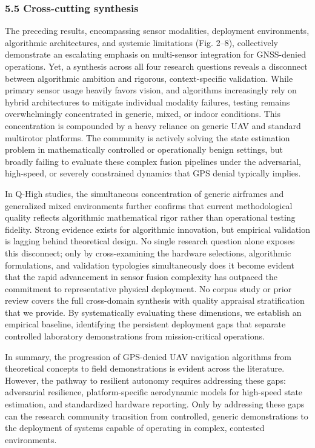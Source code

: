 \documentclass[conference]{IEEEtran}
\begin{document}
\subsubsection{5.5 Cross-cutting synthesis}


The preceding results, encompassing sensor modalities, deployment environments, algorithmic architectures, and systemic limitations (Fig. 2–8), collectively demonstrate an escalating emphasis on multi-sensor integration for GNSS-denied operations. Yet, a synthesis across all four research questions reveals a disconnect between algorithmic ambition and rigorous, context-specific validation. While primary sensor usage heavily favors vision, and algorithms increasingly rely on hybrid architectures to mitigate individual modality failures, testing remains overwhelmingly concentrated in generic, mixed, or indoor conditions. This concentration is compounded by a heavy reliance on generic UAV and standard multirotor platforms. The community is actively solving the state estimation problem in mathematically controlled or operationally benign settings, but broadly failing to evaluate these complex fusion pipelines under the adversarial, high-speed, or severely constrained dynamics that GPS denial typically implies.


In Q-High studies, the simultaneous concentration of generic airframes and generalized mixed environments further confirms that current methodological quality reflects algorithmic mathematical rigor rather than operational testing fidelity. Strong evidence exists for algorithmic innovation, but empirical validation is lagging behind theoretical design. No single research question alone exposes this disconnect; only by cross-examining the hardware selections, algorithmic formulations, and validation typologies simultaneously does it become evident that the rapid advancement in sensor fusion complexity has outpaced the commitment to representative physical deployment. No corpus study or prior review covers the full cross-domain synthesis with quality appraisal stratification that we provide. By systematically evaluating these dimensions, we establish an empirical baseline, identifying the persistent deployment gaps that separate controlled laboratory demonstrations from mission-critical operations.


In summary, the progression of GPS-denied UAV navigation algorithms from theoretical concepts to field demonstrations is evident across the literature. However, the pathway to resilient autonomy requires addressing these gaps: adversarial resilience, platform-specific aerodynamic models for high-speed state estimation, and standardized hardware reporting. Only by addressing these gaps can the research community transition from controlled, generic demonstrations to the deployment of systems capable of operating in complex, contested environments.
\end{document}
